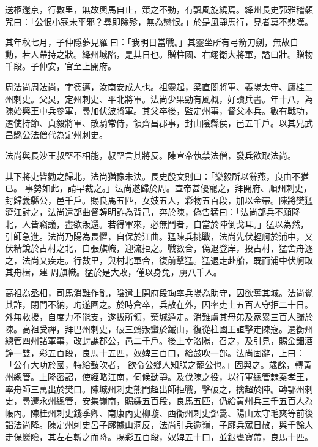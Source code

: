 \begin{pinyinscope}
 送柩還京，行數里，無故輿馬自止，策之不動，有飄風旋繞焉。絳州長史郭雅稽顙咒曰：「公恨小寇未平邪？尋即除殄，無為戀恨。」於是風靜馬行，見者莫不悲嘆。



 其年秋七月，子仲隱夢見羅曰：「我明日當戰。」其靈坐所有弓箭刀劍，無故自動，若人帶持之狀。絳州城陷，是其日也。贈柱國、右翊衛大將軍，謚曰壯。贈物千段。子仲安，官至上開府。



 周法尚周法尚，字德邁，汝南安成人也。祖靈起，梁直閤將軍、義陽太守、廬桂二州刺史。父炅，定州刺史、平北將軍。法尚少果勁有風概，好讀兵書。年十八，為陳始興王中兵參軍，尋加伏波將軍。其父卒後，監定州事，督父本兵。數有戰功，遷使持節、貞毅將軍、散騎常侍，領齊昌郡事，封山陰縣侯，邑五千戶。以其兄武昌縣公法僧代為定州刺史。



 法尚與長沙王叔堅不相能，叔堅言其將反。陳宣帝執禁法僧，發兵欲取法尚。



 其下將吏皆勸之歸北，法尚猶豫未決。長史殷文則曰：「樂毅所以辭燕，良由不猶已。
 事勢如此，請早裁之。」法尚遂歸於周。宣帝甚優寵之，拜開府、順州刺史，封歸義縣公，邑千戶。賜良馬五匹，女妓五人，彩物五百段，加以金帶。陳將樊猛濟江討之，法尚遣部曲督韓明詐為背己，奔於陳，偽告猛曰：「法尚部兵不願降北，人皆竊議，盡欲叛還。若得軍來，必無鬥者，自當於陣倒戈耳。」猛以為然，引師急進。法尚乃陽為畏懼，自保於江曲。猛陳兵挑戰，法尚先伏輕舸於浦中，又伏精銳於古村之北，自張旗幟，迎流拒之。戰數合，偽退登岸，投古村，猛舍舟逐之，法尚又疾走。行數里，與村北軍合，復前擊猛。猛退走赴船，既而浦中伏舸取其舟楫，建
 周旗幟。猛於是大敗，僅以身免，虜八千人。



 高祖為丞相，司馬消難作亂，陰遣上開府段珣率兵陽為助守，因欲奪其城。法尚覺其詐，閉門不納，珣遂圍之。於時倉卒，兵散在外，因率吏士五百人守拒二十日。外無救援，自度力不能支，遂拔所領，棄城遁走。消難虜其母弟及家累三百人歸於陳。高祖受禪，拜巴州刺史，破三鵶叛蠻於鐵山，復從柱國王誼擊走陳寇。遷衡州總管四州諸軍事，改封譙郡公，邑二千戶。後上幸洛陽，召之，及引見，賜金鈿酒鐘一雙，彩五百段，良馬十五匹，奴婢三百口，給鼓吹一部。法尚固辭，上曰：「公有大功於國，特給鼓吹者，
 欲令公鄉人知朕之寵公也。」固與之。歲餘，轉黃州總管。上降密詔，使經略江南，伺候動靜。及伐陳之役，以行軍總管隸秦孝王，率舟師三萬出於樊口。陳城州刺史熊門超出師拒戰，擊破之，擒超於陣。轉鄂州刺史，尋遷永州總管，安集嶺南，賜縑五百段，良馬五匹，仍給黃州兵三千五百人為帳內。陳桂州刺史錢季卿、南康內史柳璇、西衡州刺史鄧暠、陽山太守毛爽等前後詣法尚降。陳定州刺史呂子廓據山洞反，法尚引兵逾嶺，子廓兵眾日散，與千餘人走保巖險，其左右斬之而降。賜彩五百段，奴婢五十口，並銀甕寶帶，良馬十匹。




\end{pinyinscope}

